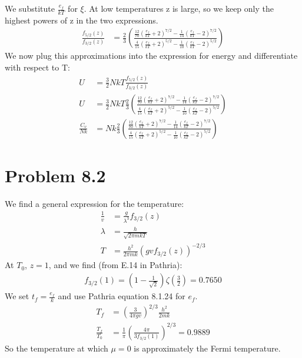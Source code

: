 \documentclass[a4paper,11pt]{article}
\numberwithin{equation}{section}
\begin{document}
We substitute $\frac{e_f}{kT}$ for $\xi$. 
At low temperatures z is large, so we keep only the highest powers of z in the two expressions. 
\begin{align}
 \frac{f_{5/2}(z)}{f_{3/2}(z)} &= \frac{2}{3}\left(
		  \frac{\frac{12}{70}(\frac{e_f}{kT}+2)^{7/2}-\frac{1}{14}(\frac{e_f}{kT}-2)^{7/2}}
		  {\frac{4}{15}(\frac{e_f}{kT}+2)^{5/2}-\frac{1}{10}(\frac{e_f}{kT}-2)^{5/2}} \right)
\end{align}
We now plug this approximations into the expression for energy and differentiate with respect to T:
\begin{align}
 U &= \frac{3}{2}NkT\frac{f_{5/2}(z)}{f_{3/2}(z)}\\
 U &= \frac{3}{2}NkT\frac{2}{3}\left(
		  \frac{\frac{12}{70}(\frac{e_f}{kT}+2)^{7/2}-\frac{1}{14}(\frac{e_f}{kT}-2)^{7/2}}
		  {\frac{4}{15}(\frac{e_f}{kT}+2)^{5/2}-\frac{1}{10}(\frac{e_f}{kT}-2)^{5/2}} \right)\\
 \frac{C_v}{Nk} &= Nk\frac{2}{3}\left(
		  \frac{\frac{12}{70}(\frac{e_f}{kT}+2)^{7/2}-\frac{1}{14}(\frac{e_f}{kT}-2)^{7/2}}
		  {\frac{4}{15}(\frac{e_f}{kT}+2)^{5/2}-\frac{1}{10}(\frac{e_f}{kT}-2)^{5/2}} \right)
\end{align}



\section{Problem 8.2}
We find a general expression for the temperature:
\begin{align}
 \frac{1}{v} &= \frac{g}{\lambda^3}f_{3/2}(z)\\
 \lambda &= \frac{h}{\sqrt{2\pi mkT}}\\
 T &= \frac{h^2}{2\pi mk}\left(gvf_{3/2}(z) \right)^{-2/3}
\end{align}
At $T_0$, $z=1$, and we find (from E.14 in Pathria):
\begin{align}
 f_{3/2}(1) = (1-\frac{1}{\sqrt{2}})\zeta (\frac{3}{2}) = 0.7650
\end{align}
We set $t_f=\frac{e_f}{k}$ and use Pathria equation 8.1.24 for $e_f$. 
\begin{align}
 T_f &= \left(\frac{3}{4\pi gv} \right)^{2/3}\frac{h^2}{2mk}\\
 \frac{T_f}{T_0} &= \frac{1}{\pi}\left(\frac{4\pi}{3f_{3/2}(1)} \right)^{2/3} = 0. 9889
\end{align}
So the temperature at which $\mu =0$ is approximately the Fermi temperature.
\\ \\
\end{document}
